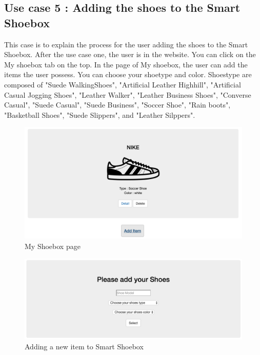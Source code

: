 \documentclass[conference]{IEEEtran}
\begin{document}
\subsection{Use case 5 : Adding the shoes to the Smart Shoebox} This case is to explain the process for the user adding the shoes to the Smart Shoebox. After the use case one, the user is in the website. You can click on the My shoebox tab on the top. In the page of My shoebox, the user can add the items the user possess. You can choose your shoetype and color. Shoestype are composed of "Suede WalkingShoes", "Artificial Leather Highhill", "Artificial Casual Jogging Shoes", "Leather Walker", "Leather Business Shoes", "Converse Casual", "Suede Casual", "Suede Business", "Soccer Shoe", "Rain boots", "Basketball Shoes", "Suede Slippers", and "Leather Silppers".
\begin{figure}[H]
\begin{center}
    \includegraphics[scale=0.26]{capture7}
    \caption{My Shoebox page} \label{fig:label}
\end{center}
\end{figure}
\begin{figure}[H]
\begin{center}
    \includegraphics[scale=0.26]{capture8}
    \caption{Adding a new item to Smart Shoebox} \label{fig:label}
\end{center}
\end{figure}
\end{document}
